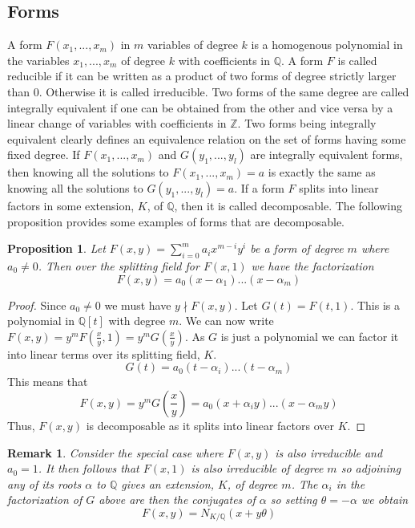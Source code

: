 \documentclass{article}
\newtheorem{proposition}{Proposition}[section]
\newtheorem{remark}{Remark}[section]
\newcommand{\mbb}[1]{\mathbb{#1}}
\numberwithin{equation}{section}
\begin{document}
\subsection{Forms}
A form $F(x_1, ..., x_m)$ in $m$ variables of degree $k$ is a homogenous polynomial in the variables $x_1, ..., x_m$ of degree $k$ with coefficients in $\mbb{Q}$. A form $F$ is called reducible if it can be written as a product of two forms of degree strictly larger than 0. Otherwise it is called irreducible. Two forms of the same degree are called integrally equivalent if one can be obtained from the other and vice versa by a linear change of variables with coefficients in $\mbb{Z}$. Two forms being integrally equivalent clearly defines an equivalence relation on the set of forms having some fixed degree. If $F(x_1, ..., x_m)$ and $G(y_1, ..., y_l)$ are integrally equivalent forms, then knowing all the solutions to $F(x_1, ..., x_m) = a$ is exactly the same as knowing all the solutions to $G(y_1, ..., y_l) = a$. If a form $F$ splits into linear factors in some extension, $K$, of $\mbb{Q}$, then it is called decomposable.
The following proposition provides some examples of forms that are decomposable.

\begin{proposition}\label{prop: Forms of two variables are decomposable}
    Let $F(x,y) = \sum_{i=0}^m a_i x^{m-i}y^{i}$ be a form of degree $m$ where $a_0 \neq 0$. Then over the splitting field for $F(x,1)$ we have the factorization
    $$F(x, y) = a_0(x - \alpha_1)...(x - \alpha_m)$$
\end{proposition}
\begin{proof}
    Since $a_0 \neq 0$ we must have $y \nmid F(x, y)$. Let $G(t) = F(t, 1)$. This is a polynomial in $\mbb Q[t]$ with degree $m$. We can now write
    $F(x, y) = y^mF(\frac{x}{y}, 1) = y^m G(\frac{x}{y})$. As $G$ is just a polynomial we can factor it into linear terms over its splitting field, $K$.
    $$G(t) = a_0 (t - \alpha_i) ... (t - \alpha_m)$$
    This means that
    $$F(x,y) = y^mG(\frac{x}{y}) =  a_0 (x + \alpha_iy) ... (x - \alpha_m y)$$
    Thus, $F(x,y)$ is decomposable as it splits into linear factors over $K$.
\end{proof}
\begin{remark}\label{remark: Forms of two variables are decomposable}
    Consider the special case where $F(x,y)$ is also irreducible and $a_0 = 1$. It then follows that $F(x,1)$ is also irreducible of degree $m$ so adjoining any of its roots $\alpha$ to $\mbb Q$ gives an extension, $K$, of degree $m$. The $\alpha_i$ in the factorization of $G$ above are then the conjugates of $\alpha$ so setting $\theta = -\alpha$ we obtain
    $$F(x,y) = N_{K / \mbb Q}(x + y \theta)$$
\end{remark}
\end{document}
